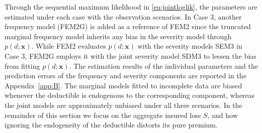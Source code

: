 \documentclass[11pt]{article}
\begin{document}
Through the sequential maximum likelihood in \eqref{eq:jointloglik}, the parameters are estimated under each case with the observation scenarios. In Case 3, another frequency model (FEM2G) is added as a reference of FEM2 since the truncated marginal frequency model inherits any bias in the severity model through $p(d;\bm{x})$. While FEM2 evaluates $p(d;\bm{x})$ with the severity models SEM3 in Case 3, FEM2G employs it with the joint severity model SDM3 to lessen
the bias from fitting $p(d;\bm{x})$. %
The estimation results of the individual parameters and the prediction errors of the frequency and severity components are reported in the Appendix~\ref{app:B}. The marginal models fitted to incomplete data are biased whenever the deductible is endogenous to the corresponding component, whereas the joint models are approximately unbiased under all three scenarios. In the remainder of this section we focus on the aggregate insured loss $S$, and how ignoring the endogeneity of the deductible distorts its pure premium.
\end{document}
